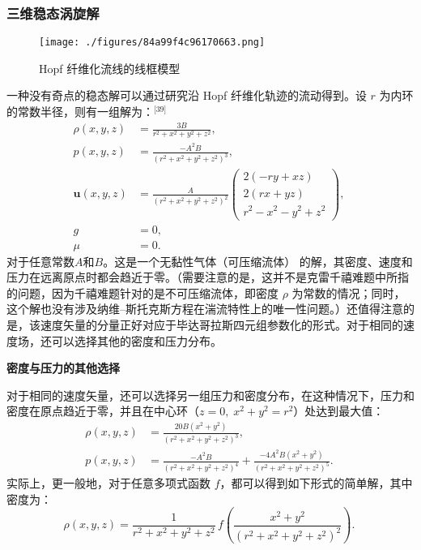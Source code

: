 \subsubsection{三维稳态涡旋解}
\begin{figure}[ht]
\centering
\texttt{[image: ./figures/84a99f4c96170663.png]}
\caption{Hopf 纤维化流线的线框模型} \label{fig_NWstks_4}
\end{figure}
一种没有奇点的稳态解可以通过研究沿 Hopf 纤维化轨迹的流动得到。设 $r$ 为内环的常数半径，则有一组解为：\(^\text{[39]}\)
$$
\begin{aligned}
\rho(x, y, z) &= 
\frac{3B}{r^2 + x^2 + y^2 + z^2}, \\[6pt]
p(x, y, z) &= 
\frac{-A^2 B}{\left(r^2 + x^2 + y^2 + z^2\right)^3}, \\[6pt]
\mathbf{u}(x, y, z) &= 
\frac{A}{\left(r^2 + x^2 + y^2 + z^2\right)^2}
\begin{pmatrix}
2(-ry + xz) \\[6pt]
2(rx + yz) \\[6pt]
r^2 - x^2 - y^2 + z^2
\end{pmatrix}, \\[6pt]
g &= 0, \\[6pt]
\mu &= 0.
\end{aligned}~
$$
对于任意常数$A$和$B$。这是一个无黏性气体（可压缩流体） 的解，其密度、速度和压力在远离原点时都会趋近于零。（需要注意的是，这并不是克雷千禧难题中所指的问题，因为千禧难题针对的是不可压缩流体，即密度 $\rho$ 为常数的情况；同时，这个解也没有涉及纳维–斯托克斯方程在湍流特性上的唯一性问题。）还值得注意的是，该速度矢量的分量正好对应于毕达哥拉斯四元组参数化的形式。对于相同的速度场，还可以选择其他的密度和压力分布。

\textbf{密度与压力的其他选择}

对于相同的速度矢量，还可以选择另一组压力和密度分布，在这种情况下，压力和密度在原点趋近于零，并且在中心环（$z = 0, \; x^2 + y^2 = r^2$）处达到最大值：
$$
\begin{aligned}
\rho(x, y, z) &= 
\frac{20B(x^2 + y^2)}{\left(r^2 + x^2 + y^2 + z^2\right)^3}, \\[6pt]
p(x, y, z) &= 
\frac{-A^2 B}{\left(r^2 + x^2 + y^2 + z^2\right)^4} +
\frac{-4A^2 B(x^2 + y^2)}{\left(r^2 + x^2 + y^2 + z^2\right)^5}.
\end{aligned}~
$$
实际上，更一般地，对于任意多项式函数 $f$，都可以得到如下形式的简单解，其中密度为：
$$
\rho(x, y, z) =
\frac{1}{r^2 + x^2 + y^2 + z^2}
\, f\!\left(\frac{x^2 + y^2}{\left(r^2 + x^2 + y^2 + z^2\right)^2}\right).~
$$
